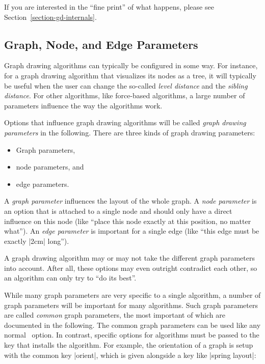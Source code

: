 If you are interested in the ``fine print'' of what happens, please
see Section~\ref{section-gd-internals}.



\subsection{Graph, Node, and Edge Parameters}

Graph drawing algorithms can typically be configured in some way. For
instance, for a graph drawing algorithm that visualizes its nodes as a
tree, it will typically be useful when the user can change the
so-called \emph{level distance} and the \emph{sibling distance}. For
other algorithms, like force-based algorithms, a large number of
parameters influence the way the algorithms work.

Options that influence graph drawing algorithms will be called
\emph{graph drawing parameters} in the following. There are three kinds of
graph drawing parameters:
\begin{itemize}
\item Graph parameters,
\item node parameters, and
\item edge parameters.
\end{itemize}
A \emph{graph parameter} influences the layout of the whole
graph. A  \emph{node parameter} is an option that is attached to
a single node and should only have a direct influence on this node
(like ``place this node exactly at this position, no matter what''). An
\emph{edge parameter} is important for a single edge (like
``this edge must be exactly |2cm| long'').

A graph drawing algorithm may or may not take the different graph
parameters into account. After all, these options may even outright
contradict each other, so an algorithm can only try to ``do its
best''.

While many graph parameters are very specific to a single algorithm, a
number of graph parameters will be important for many algorithms. Such
graph parameters are called \emph{common} graph parameters, the most
important of which are documented in the following. The common graph
parameters can be used like any normal \tikzname\ option. In contrast,
specific options for algorithms must be passed to the key that
installs the algorithm. For example, the orientation of a graph
is setup with the common key |orient|, which is given alongside a key
like |spring layout|:

